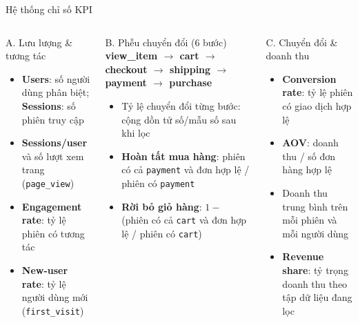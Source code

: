 \documentclass[aspectratio=169]{beamer}
\begin{document}
\begin{frame}{Hệ thống chỉ số KPI}
  \small
  \begin{columns}[T,onlytextwidth]
    \begin{block}{A. Lưu lượng \& tương tác}
      \scriptsize
      \begin{itemize}
        \item \textbf{Users}: số người dùng phân biệt; \textbf{Sessions}: số phiên truy cập
        \item \textbf{Sessions/user} và số lượt xem trang (\texttt{page\_view})
        \item \textbf{Engagement rate}: tỷ lệ phiên có tương tác
        \item \textbf{New-user rate}: tỷ lệ người dùng mới (\texttt{first\_visit})
      \end{itemize}
      \vspace{0.6cm}
    \end{block}

    \begin{block}{B. Phễu chuyển đổi (6 bước)}
      \scriptsize
      \textbf{view\_item $\rightarrow$ cart $\rightarrow$ checkout $\rightarrow$ shipping $\rightarrow$ payment $\rightarrow$ purchase}
      \medskip
      \begin{itemize}
        \item Tỷ lệ chuyển đổi từng bước: cộng dồn tử số/mẫu số sau khi lọc
        \item \textbf{Hoàn tất mua hàng}: phiên có cả \texttt{payment} và đơn hợp lệ / phiên có \texttt{payment}
        \item \textbf{Rời bỏ giỏ hàng}: $1 -$ (phiên có cả \texttt{cart} và đơn hợp lệ / phiên có \texttt{cart})
      \end{itemize}
    \end{block}

    \begin{block}{C. Chuyển đổi \& doanh thu}
      \scriptsize
      \begin{itemize}
        \item \textbf{Conversion rate}: tỷ lệ phiên có giao dịch hợp lệ
        \item \textbf{AOV}: doanh thu / số đơn hàng hợp lệ
        \item Doanh thu trung bình trên mỗi phiên và mỗi người dùng
        \item \textbf{Revenue share}: tỷ trọng doanh thu theo tập dữ liệu đang lọc
      \end{itemize}
      \vspace{0.6cm}
    \end{block}
  \end{columns}


\end{frame}
\end{document}
